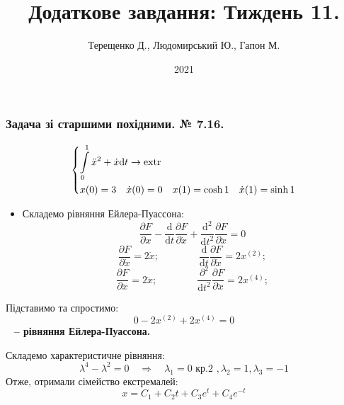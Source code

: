 \documentclass{beamer}
\title{Додаткове завдання: Тиждень 11.}
\author{Терещенко Д., Людомирський Ю., Гапон М.}
\institute{KA-96, IASA}
\date{2021}
\def\d{\partial}
\begin{document}
\frame{\titlepage}

\begin{frame}
\frametitle{Задача зі старшими похідними. № 7.16.}
$$
\begin{dcases}
  \int\limits_{0}^{1}{ \ddot{x}^2 + \dot{x} \mathrm{d} t \to \mathrm{extr}} \\
  x(0) = 3 \quad \dot{x} (0) = 0 \quad x(1) = \cosh{1} \quad \dot{x} (1) = \sinh{1}
\end{dcases}
$$
\begin{itemize}
  \item Складемо рівняння Ейлера-Пуассона:
  $$
  \frac{\d F}{\d x} - \frac{\mathrm{d}}{ \mathrm{d} t} \frac{\d F}{\d \dot{x}} + \frac{\mathrm{d}^2}{\mathrm{d} t^2} \frac{\d F }{\d \ddot{x}} = 0
  $$
  $$
  \frac{\d F}{\d \dot{x}} = 2 \dot{x} ; \qquad \qquad \frac{\mathrm{d}}{\mathrm{d} t} \frac{\d F}{\d \dot{x}} = 2 x^{(2)};
  $$
  $$
  \frac{\d F}{\d \ddot{x}} = 2 \ddot{x} ; \qquad \qquad \frac{\d^2}{\mathrm{d} t^2} \frac{\d F}{\d \ddot{x}} = 2x^{(4)}  ;
  $$
\end{itemize}
\end{frame}


\begin{frame}
Підставимо та спростимо:
$$
0 -  2 x^{(2)} + 2 x^{(4)} = 0
$$
 \ \textbf{ -- рівняння Ейлера-Пуассона.}

Складемо характеристичне рівняння:
$$
\lambda^4 - \lambda^2 = 0 \quad \Longrightarrow \quad \lambda_1=0 \text{ кр.2 }, \lambda_2 = 1, \lambda_3 = -1
$$
Отже, отримали \alert{сімейство екстремалей:}
$$
x = C_1 + C_2 t + C_3 e^{t} + C_4 e^{-t}
$$
\end{frame}
\end{document}
